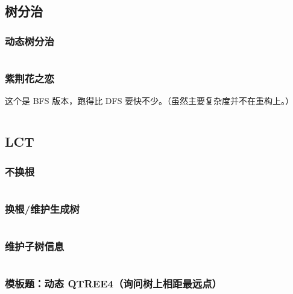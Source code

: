 \documentclass[a4paper, twoside]{article}
\begin{document}
\begin{multicols}{2}
			\subsection{树分治}

				
				\subsubsection{动态树分治}
					\inputminted{cpp}{../src/datastructure/动态树分治.cpp}

				\subsubsection{紫荆花之恋}

					这个是 BFS 版本，跑得比 DFS 要快不少。（虽然主要复杂度并不在重构上。）
					\inputminted{cpp}{../src/datastructure/紫荆花之恋.cpp}
	
			\subsection[LCT 动态树]{LCT}
				\subsubsection[不换根（弹飞绵羊）]{不换根}
					\inputminted{cpp}{../src/datastructure/LCT(不换根).cpp}
			
				\subsubsection{换根/维护生成树}
					\inputminted{cpp}{../src/datastructure/LCT(换根).cpp}

				\subsubsection{维护子树信息}
					\inputminted{cpp}{../src/datastructure/LCT维护子树信息.cpp}
					
				\subsubsection[模板题：动态QTREE4]{模板题：动态 QTREE4（询问树上相距最远点）}
						\inputminted{cpp}{../src/datastructure/动态QTREE4.cpp}
	

\end{multicols}
\end{document}
